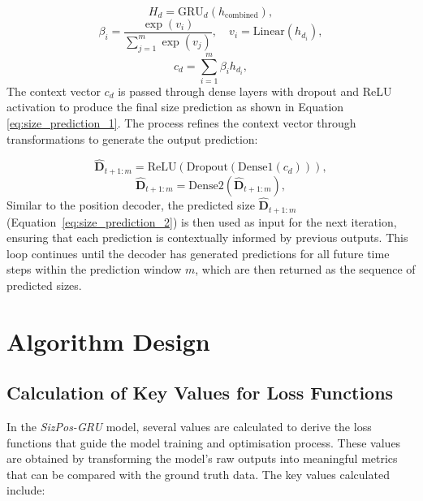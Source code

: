\documentclass[12pt,oneside]{book} %
\begin{document}
\begin{equation}
    H_d = \text{GRU}_d(h_{\text{combined}}), \label{eq:size_decoder_gru}
\end{equation}
\begin{equation}
    \beta_i = \frac{\exp(v_i)}{\sum_{j=1}^{m}\exp(v_j)}, \quad v_i = \text{Linear}(h_{d_i}), \label{eq:attention_scores_size}
\end{equation}
\begin{equation}
    c_d = \sum_{i=1}^{m} \beta_i h_{d_i}, \label{eq:context_vector_size}
\end{equation}
The context vector \(c_d\) is passed through dense layers with dropout and ReLU
activation to produce the final size prediction as shown in Equation
\eqref{eq:size_prediction_1}. The process refines the context vector through
transformations to generate the output prediction:

\begin{equation}
    \hat{\mathbf{D}}_{t+1:m} = \text{ReLU}(\text{Dropout}(\text{Dense}1(c_d))), \label{eq:size_prediction_1}
\end{equation}
\begin{equation}
    \hat{\mathbf{D}}_{t+1:m} = \text{Dense}2(\hat{\mathbf{D}}_{t+1:m}), \label{eq:size_prediction_2}
\end{equation}
Similar to the position decoder, the predicted size
\(\hat{\mathbf{D}}_{t+1:m}\) (Equation~\eqref{eq:size_prediction_2}) is then used as input for the next iteration,
ensuring that each prediction is contextually informed by previous outputs.
This loop continues until the decoder has generated predictions for all future
time steps within the prediction window \(m\), which are then returned as the
sequence of predicted sizes.

\section{Algorithm Design}

\subsection{Calculation of Key Values for Loss Functions}
\noindent In the \textit{SizPos-GRU} model, several values are calculated to derive the loss functions that guide the model training and optimisation process. These values are obtained by transforming the model's raw outputs into meaningful metrics that can be compared with the ground truth data. The key values calculated include:
\end{document}
